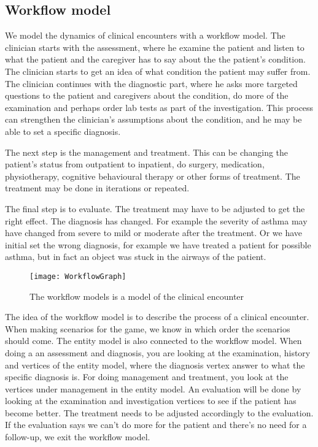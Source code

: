 \subsection{Workflow model}
We model the dynamics of clinical encounters with a workflow model. The clinician starts with the assessment, where he examine the patient and listen to what the patient and the caregiver has to say about the the patient's condition. The clinician starts to get an idea of what condition the patient may suffer from. The clinician continues with the diagnostic part, where he asks more targeted questions to the patient and caregivers about the condition, do more of the examination and perhaps order lab tests as part of the investigation. This process can strengthen the clinician's assumptions about the condition, and he may be able to set a specific diagnosis.

The next step is the management and treatment. This can be changing the patient's status from outpatient to inpatient, do surgery, medication, physiotherapy, cognitive behavioural therapy or other forms of treatment. The treatment may be done in iterations or repeated.


The final step is to evaluate. The treatment may have to be adjusted to get the right effect. The diagnosis has changed. For example the severity of asthma may have changed from severe to mild or moderate after the treatment. Or we have initial set the wrong diagnosis, for example we have treated a patient for possible asthma, but in fact an object was stuck in the airways of the patient.


\begin{figure}[h!]
	\caption {The workflow models is a model of the clinical encounter}
	\label{fig:WorkflowGraph}
	\texttt{[image: WorkflowGraph]}
\end{figure}

The idea of the workflow model is to describe the process of a clinical encounter. When making scenarios for the game, we know in which order the scenarios should come. The entity model is also connected to the workflow model. When doing a an assessment and diagnosis, you are looking at the examination, history and vertices of the entity model, where the diagnosis vertex answer to what the specific diagnosis is. For doing management and treatment, you look at the vertices under management in the entity model. An evaluation will be done by looking at the examination and investigation vertices to see if the patient has become better. The treatment needs to be adjusted accordingly to the evaluation. If the evaluation says we can't do more for the patient and there's no need for a follow-up, we exit the workflow model.

